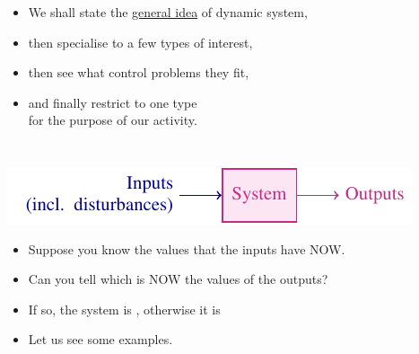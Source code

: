 \begin{frame}
\begin{columns}
   \begin{itemize}[<+-| alert@+>]
   \item We shall state the \underline{general idea} of dynamic system,
   \item \vspace{8mm}then specialise to a few types of interest,
   \item \vspace{8mm}then see what control problems they fit,
   \item \vspace{8mm}and finally restrict to one type\\
         for the purpose of our activity.
   \end{itemize}
 \end{columns}
\end{frame}

\begin{frame}
\myPause
 \begin{center}
  \includegraphics[width=0.6\columnwidth]{./Unit-01/img/DynSys-GenericSystem.pdf}
  \myPause
 \end{center}
 \begin{itemize}[<+-| alert@+>]
 \item Suppose you know the values that the inputs have NOW.
 \item Can you tell which is NOW the values of the outputs?
 \item \vfill If so, the system is , otherwise it is 
 \item Let us see some examples.
 \end{itemize}
\end{frame}

